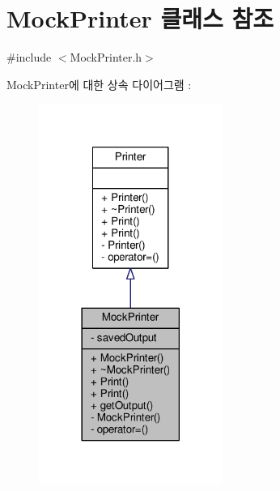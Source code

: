 \hypertarget{class_mock_printer}{}\section{Mock\+Printer 클래스 참조}
\label{class_mock_printer}


{\ttfamily \#include $<$Mock\+Printer.\+h$>$}



Mock\+Printer에 대한 상속 다이어그램 \+: 
\nopagebreak
\begin{figure}[H]
\begin{center}
\leavevmode
\includegraphics[width=170pt]{class_mock_printer__inherit__graph}
\end{center}
\end{figure}



